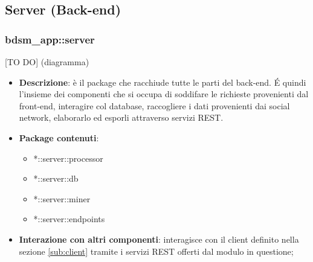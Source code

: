 


\subsection{Server (Back-end)} %
\label{sub:server}

  \subsubsection{bdsm\_app::server} %
  [TO DO] (diagramma) \newline \newline

  \begin{itemize}
    \item \textbf{Descrizione}: è il package che racchiude tutte le parti del back-end. \'E quindi l'insieme dei componenti che si occupa di soddifare le richieste provenienti dal front-end, interagire col database, raccogliere i dati provenienti dai social network, elaborarlo ed esporli attraverso servizi REST.
    \item \textbf{Package contenuti}:
      \begin{itemize}
        \item *::server::processor
        \item *::server::db
        \item *::server::miner
        \item *::server::endpoints
      \end{itemize}
    \item \textbf{Interazione con altri componenti}: interagisce con il client definito nella sezione \ref{sub:client} tramite i servizi REST offerti dal modulo in questione;
  \end{itemize}

